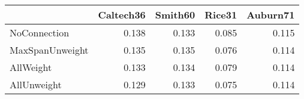 \begin{tabular}{lrrrr}
\toprule
{} & Caltech36 & Smith60 & Rice31 & Auburn71 \\
\midrule
NoConnection    &     0.138 &   0.133 &  0.085 &    0.115 \\
MaxSpanUnweight &     0.135 &   0.135 &  0.076 &    0.114 \\
AllWeight       &     0.133 &   0.134 &  0.079 &    0.114 \\
AllUnweight     &     0.129 &   0.133 &  0.075 &    0.114 \\
\bottomrule
\end{tabular}
